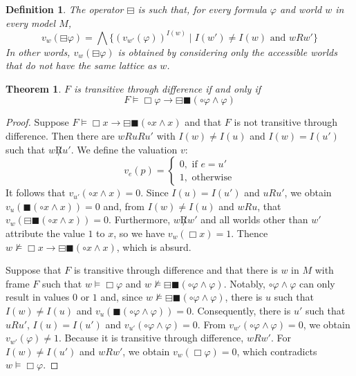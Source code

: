 \documentclass{amsart}
\newtheorem{definition}{Definition}[section]
\newtheorem{theorem}{Theorem}[section]
\newcommand{\so}{\rightarrow}
\newcommand{\bBox}{\blacksquare}
\newcommand{\mBox}{\boxminus}
\begin{document}
\begin{definition} The operator $\mBox$ is such that, for every formula $\varphi$ and world $w$ in every model $M$,
    $$v_w( \mBox\varphi) = \bigwedge \{(v_{w'}(\varphi))^{I(w)} \mid I(w') \neq I(w) \text{ and } w R w'\}$$
    In other words, $v_w( \mBox\varphi)$ is obtained by considering only the accessible worlds that do not have the same lattice as $w$.
\end{definition} 

\begin{theorem}
    $F$ is transitive through difference if and only if 
    $$F \vDash \Box \varphi \so \mBox \bBox (\circ \varphi \land \varphi)$$
\end{theorem}

\begin{proof}
    Suppose $F \vDash \Box x \so \mBox \bBox (\circ x \land x)$ and that $F$ is not transitive through difference. Then there are $w R u R u'$ with $I(w) \neq I(u)$ and $I(w) = I(u')$ such that $w \not R u'$. We define the valuation $v$:
    $$v_e(p) = \begin{cases}
        0, \text{ if } e = u' \\
        1, \text{ otherwise}
    \end{cases}$$
    It follows that $v_{u'}(\circ x \land x) = 0$. Since $I(u) = I(u')$ and $u R u'$, we obtain $v_u(\bBox (\circ x \land x)) = 0$ and, from $I(w) \neq I(u)$ and $w R u$, that $v_w(\mBox \bBox (\circ x \land x)) = 0$. Furthermore, $w \not R w'$ and all worlds other than $w'$ attribute the value $1$ to $x$, so we have $v_w(\Box x) = 1$. Thence $w \nvDash \Box x \so \mBox \bBox (\circ x \land x)$, which is absurd.

    Suppose that $F$ is transitive through difference and that there is $w$ in $M$ with frame $F$ such that $w \vDash \Box \varphi$ and $w \nvDash \mBox \bBox (\circ \varphi \land \varphi)$. Notably, $\circ \varphi \land \varphi$ can only result in values $0$ or $1$ and, since $w \nvDash \mBox \bBox (\circ \varphi \land \varphi)$, there is $u$ such that $I(w) \neq I(u)$ and $v_u(\bBox (\circ \varphi \land \varphi)) =0$. Consequently, there is $u'$ such that $u R u'$, $I(u) = I(u')$ and $v_{u'}(\circ \varphi \land \varphi) = 0$. From $v_{w'}(\circ \varphi \land \varphi) = 0$, we obtain $v_{w'}(\varphi) \neq 1$. 
    Because it is transitive through difference, $w R w'$. For $I(w) \neq I(u')$ and $w R w'$, we obtain $v_w(\Box \varphi) = 0$, which contradicts $w \vDash \Box \varphi$.
\end{proof}
\end{document}
